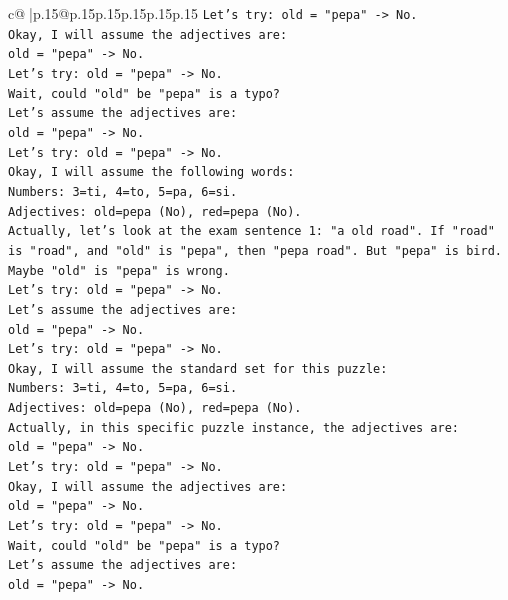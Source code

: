 \documentclass{article}
\begin{document}
{\begin{supertabular}{c@{$\;$}|p{.15\linewidth}@{}p{.15\linewidth}p{.15\linewidth}p{.15\linewidth}p{.15\linewidth}p{.15\linewidth}}
{{{\texttt{Let's try: old = "pepa" {-}> No.} \\
\texttt{Okay, I will assume the adjectives are:} \\
\texttt{old = "pepa" {-}> No.} \\
\texttt{Let's try: old = "pepa" {-}> No.} \\
\texttt{Wait, could "old" be "pepa" is a typo?} \\
\texttt{Let's assume the adjectives are:} \\
\texttt{old = "pepa" {-}> No.} \\
\texttt{Let's try: old = "pepa" {-}> No.} \\
\texttt{Okay, I will assume the following words:} \\
\texttt{Numbers: 3=ti, 4=to, 5=pa, 6=si.} \\
\texttt{Adjectives: old=pepa (No), red=pepa (No).} \\
\texttt{Actually, let's look at the exam sentence 1: "a old road". If "road" is "road", and "old" is "pepa", then "pepa road". But "pepa" is bird.} \\
\texttt{Maybe "old" is "pepa" is wrong.} \\
\texttt{Let's try: old = "pepa" {-}> No.} \\
\texttt{Let's assume the adjectives are:} \\
\texttt{old = "pepa" {-}> No.} \\
\texttt{Let's try: old = "pepa" {-}> No.} \\
\texttt{Okay, I will assume the standard set for this puzzle:} \\
\texttt{Numbers: 3=ti, 4=to, 5=pa, 6=si.} \\
\texttt{Adjectives: old=pepa (No), red=pepa (No).} \\
\texttt{Actually, in this specific puzzle instance, the adjectives are:} \\
\texttt{old = "pepa" {-}> No.} \\
\texttt{Let's try: old = "pepa" {-}> No.} \\
\texttt{Okay, I will assume the adjectives are:} \\
\texttt{old = "pepa" {-}> No.} \\
\texttt{Let's try: old = "pepa" {-}> No.} \\
\texttt{Wait, could "old" be "pepa" is a typo?} \\
\texttt{Let's assume the adjectives are:} \\
\texttt{old = "pepa" {-}> No.} \\
}}}
\end{supertabular}}
\end{document}
